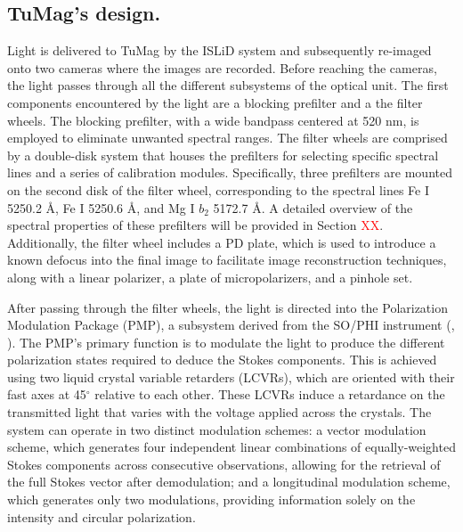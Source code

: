 \subsection{TuMag's design.}

Light is delivered to TuMag by the ISLiD system and subsequently re-imaged onto two cameras where the images are recorded. Before reaching the cameras, the light passes through all the different subsystems of the optical unit. The first components encountered by the light are a blocking prefilter and a the filter wheels. The blocking prefilter, with a wide bandpass centered at 520 nm, is employed to eliminate unwanted spectral ranges. The filter wheels  are comprised by a double-disk system \citep{filter-wheels} that houses the prefilters for selecting specific spectral lines and a series of calibration modules. Specifically, three prefilters are mounted on the second disk of the filter wheel, corresponding to the spectral lines Fe I 5250.2 \r{A}, Fe I 5250.6 \r{A}, and Mg I $b_2$ 5172.7 \r{A}. A detailed overview of the spectral properties of these prefilters will be provided in Section \textcolor{red}{XX}. Additionally, the filter wheel includes a PD plate, which is used to introduce a known defocus into the final image to facilitate image reconstruction techniques, along with a linear polarizer, a plate of micropolarizers, and a pinhole set.

After passing through the filter wheels, the light is directed into the Polarization Modulation Package (PMP), a subsystem derived from the SO/PHI instrument (\citealt{pmp1}, \citealt{PHI}). The PMP's primary function is to modulate the light to produce the different polarization states required to deduce the Stokes components. This is achieved using two liquid crystal variable retarders (LCVRs), which are oriented with their fast axes at 45$^\circ$ relative to each other. These LCVRs induce a retardance on the transmitted light that varies with the voltage applied across the crystals. The system can operate in two distinct modulation schemes: a vector modulation scheme, which generates four independent linear combinations of equally-weighted Stokes components across consecutive observations, allowing for the retrieval of the full Stokes vector after demodulation; and a longitudinal modulation scheme, which generates only two modulations, providing information solely on the intensity and circular polarization.

